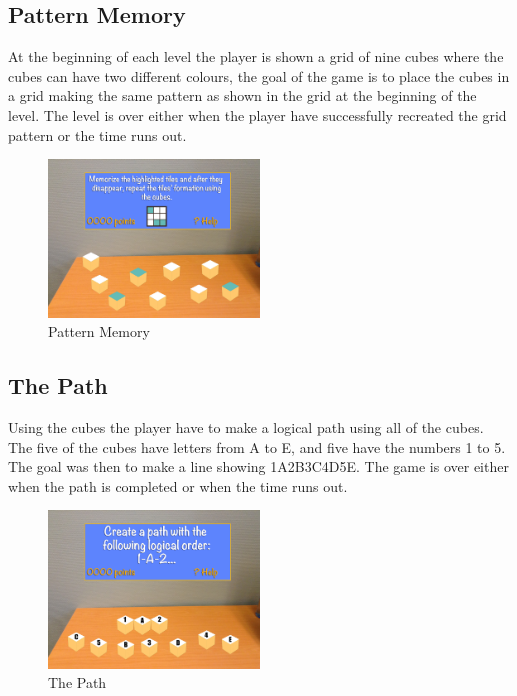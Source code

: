 \subsection{Pattern Memory}
\label{game:pattern_memory}
At the beginning of each level the player is shown a grid of nine cubes where the cubes can have two different colours, the goal of the game is to place the cubes in a grid making the same pattern as shown in the grid at the beginning of the level. The level is over either when the player have successfully recreated the grid pattern or the time runs out.

\begin{figure}
	\includegraphics[width=0.5\textwidth]{images/Costas/game_mockup3(matrix).jpg}
	\caption{Pattern Memory}
	\label{fig:Costas}
	
\end{figure}

\subsection{The Path}
\label{game:the_path}
Using the cubes the player have to make a logical path using all of the cubes. The five of the cubes have letters from A to E, and five have the numbers 1 to 5. The goal was then to make a line showing 1A2B3C4D5E. The game is over either when the path is completed or when the time runs out.

\begin{figure}
	\includegraphics[width=0.5\textwidth]{images/Costas/game_mockup5(path).jpg}
	\caption{The Path}
	\label{fig:Costas}
	
\end{figure}

